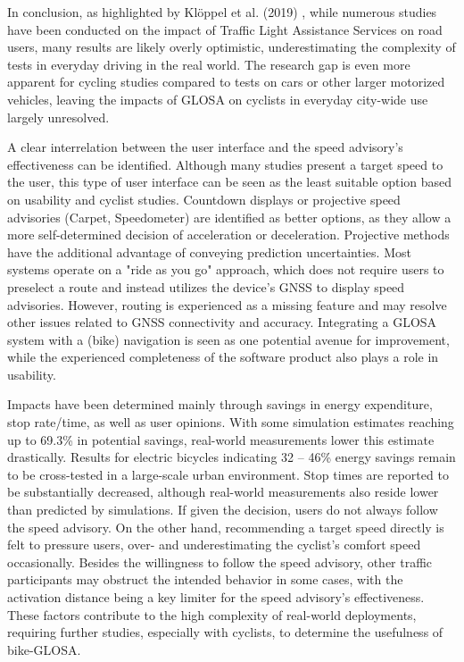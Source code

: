 In conclusion, as highlighted by Klöppel et al. (2019) \cite{kloeppel_performance_2019}, while numerous studies have been conducted on the impact of Traffic Light Assistance Services on road users, many results are likely overly optimistic, underestimating the complexity of tests in everyday driving in the real world. The research gap is even more apparent for cycling studies compared to tests on cars or other larger motorized vehicles, leaving the impacts of GLOSA on cyclists in everyday city-wide use largely unresolved.

\begin{Summary}
A clear interrelation between the user interface and the speed advisory's effectiveness can be identified. Although many studies present a target speed to the user, this type of user interface can be seen as the least suitable option based on usability and cyclist studies. Countdown displays or projective speed advisories (Carpet, Speedometer) are identified as better options, as they allow a more self-determined decision of acceleration or deceleration. Projective methods have the additional advantage of conveying prediction uncertainties. Most systems operate on a "ride as you go" approach, which does not require users to preselect a route and instead utilizes the device's GNSS to display speed advisories. However, routing is experienced as a missing feature and may resolve other issues related to GNSS connectivity and accuracy. Integrating a GLOSA system with a (bike) navigation is seen as one potential avenue for improvement, while the experienced completeness of the software product also plays a role in usability.

Impacts have been determined mainly through savings in energy expenditure, stop rate/time, as well as user opinions. With some simulation estimates reaching up to 69.3\% in potential savings, real-world measurements lower this estimate drastically. Results for electric bicycles indicating 32 -- 46\% energy savings remain to be cross-tested in a large-scale urban environment. Stop times are reported to be substantially decreased, although real-world measurements also reside lower than predicted by simulations. If given the decision, users do not always follow the speed advisory. On the other hand, recommending a target speed directly is felt to pressure users, over- and underestimating the cyclist's comfort speed occasionally. Besides the willingness to follow the speed advisory, other traffic participants may obstruct the intended behavior in some cases, with the activation distance being a key limiter for the speed advisory's effectiveness. These factors contribute to the high complexity of real-world deployments, requiring further studies, especially with cyclists, to determine the usefulness of bike-GLOSA.
\end{Summary}

